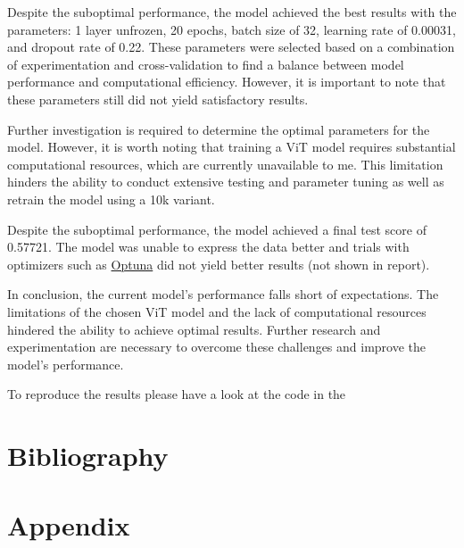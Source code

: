 \documentclass{article}
\begin{document}
Despite the suboptimal performance, the model achieved the best results with the parameters: 1 layer unfrozen, 20 epochs, batch size of 32, learning rate of 0.00031, and dropout rate of 0.22. These parameters were selected based on a combination of experimentation and cross-validation to find a balance between model performance and computational efficiency. However, it is important to note that these parameters still did not yield satisfactory results.

Further investigation is required to determine the optimal parameters for the model. However, it is worth noting that training a ViT model requires substantial computational resources, which are currently unavailable to me. This limitation hinders the ability to conduct extensive testing and parameter tuning as well as retrain the model using a 10k variant. 

Despite the suboptimal performance, the model achieved a final test score of 0.57721. The model was unable to express the data better and trials with optimizers such as \href{https://optuna.org/}{Optuna} did not yield better results (not shown in report).

In conclusion, the current model's performance falls short of expectations. The limitations of the chosen ViT model and the lack of computational resources hindered the ability to achieve optimal results. Further research and experimentation are necessary to overcome these challenges and improve the model's performance. 

To reproduce the results please have a look at the code in the \href{finalRunner}{}

\newpage
\section{Bibliography}


\section{Appendix}
\end{document}
